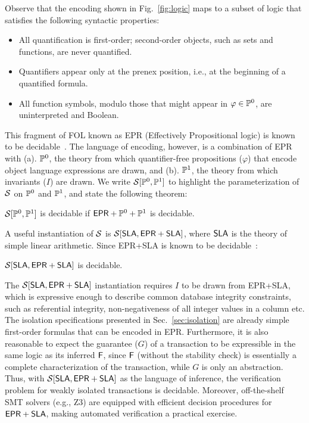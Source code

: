 Observe that the encoding shown in Fig.~\ref{fig:logic} maps to
a subset of logic that satisfies the following syntactic properties:
\begin{itemize}
  \item All quantification is first-order; second-order objects, such
    as sets and functions, are never quantified.
  \item Quantifiers appear only at the prenex position, i.e., at the
    beginning of a quantified formula.  
  \item All function symbols, modulo those that might appear in
    $\varphi\in\mathbb{P}^0$, are uninterpreted and Boolean.
\end{itemize}
This fragment of FOL known as EPR (Effectively Propositional logic)
is known to be decidable~\cite{z3epr}. The language of encoding, however, is a
combination of {\sf EPR} with (a). $\mathbb{P}^0$, the theory from which
quantifier-free propositions ($\varphi$) that encode object language
expressions are drawn, and (b).  $\mathbb{P}^1$, the theory from which
invariants ($I$) are drawn. We write $\mathcal{S}[\mathbb{P}^0,\mathbb{P}^1]$ to
highlight the parameterization of $\mathcal{S}$ on $\mathbb{P}^0$ and $\mathbb{P}^1$,
and state the following theorem:
\begin{theorem}
  $\mathcal{S}[\mathbb{P}^0,\mathbb{P}^1]$ is decidable if ${\sf EPR}+\mathbb{P}^0+\mathbb{P}^1$
  is decidable.
\end{theorem}
A useful instantiation of $\mathcal{S}$ is $\mathcal{S}[{\sf SLA},{\sf EPR}+{\sf
SLA}]$, where ${\sf SLA}$ is the theory of simple linear arithmetic.
Since {\sf EPR}+{\sf SLA} is known to be decidable~\cite{eprsla}:
\begin{theorem}
  $\mathcal{S}[{\sf SLA},{\sf EPR}+{\sf SLA}]$ is decidable.
\end{theorem}
The $\mathcal{S}[{\sf SLA},{\sf EPR}+{\sf SLA}]$ instantiation requires $I$ to
be drawn from {\sf EPR}+{\sf SLA}, which is expressive enough to
describe common database integrity constraints, such as referential
integrity, non-negativeness of all integer values in a column etc.
The isolation specifications presented in Sec.~\ref{sec:isolation} are
already simple first-order formulas that can be encoded in {\sf EPR}.
Furthermore, it is also reasonable to expect the guarantee ($G$) of a
transaction to be expressible in the same logic as its inferred ${\sf F}$,
since ${\sf F}$ (without the stability check) is essentially a complete
characterization of the transaction, while $G$ is only an abstraction.
Thus, with $\mathcal{S}[{\sf SLA},{\sf EPR}+{\sf SLA}]$ as the language of
inference, the verification problem for weakly isolated transactions
is decidable. Moreover, off-the-shelf SMT solvers (e.g., Z3) are
equipped with efficient decision procedures for ${\sf EPR}+{\sf SLA}$,
making automated verification a practical exercise.

